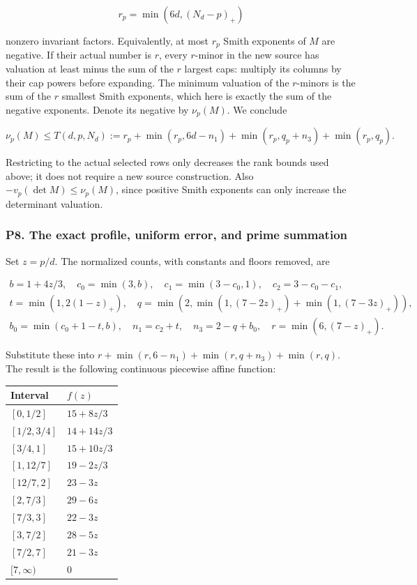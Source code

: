 \documentclass[11pt,a4paper]{article}
\begin{document}
\[
r_p=\min(6d,(N_d-p)_+)
\]

nonzero invariant factors. Equivalently, at most \(r_p\) Smith exponents of \(M\) are negative. If their actual number is \(r\), every \(r\)-minor in the new source has valuation at least minus the sum of the \(r\) largest caps: multiply its columns by their cap powers before expanding. The minimum valuation of the \(r\)-minors is the sum of the \(r\) smallest Smith exponents, which here is exactly the sum of the negative exponents. Denote its negative by \(ν_p(M)\). We conclude

\[
\nu_p(M)\le T(d,p,N_d)
:=r_p+\min(r_p,6d-n_1)+\min(r_p,q_p+n_3)+\min(r_p,q_p).\tag{35}
\]

Restricting to the actual selected rows only decreases the rank bounds used above; it does not require a new source construction. Also \(-v_p(\operatorname{det} M)≤ν_p(M)\), since positive Smith exponents can only increase the determinant valuation.

\hypertarget{p8.-the-exact-profile-uniform-error-and-prime-summation}{%
\subsubsection{P8. The exact profile, uniform error, and prime summation}\label{p8.-the-exact-profile-uniform-error-and-prime-summation}}

Set \(z=p/d\). The normalized counts, with constants and floors removed, are

\[
\begin{gathered}
b=1+4z/3,\quad c_0=\min(3,b),\quad c_1=\min(3-c_0,1),\quad c_2=3-c_0-c_1,\\
t=\min(1,2(1-z)_+),\quad
q=\min(2,\min(1,(7-2z)_+)+\min(1,(7-3z)_+)),\\
b_0=\min(c_0+1-t,b),\quad n_1=c_2+t,\quad n_3=2-q+b_0,\quad r=\min(6,(7-z)_+).
\end{gathered}
\]

Substitute these into \(r+\operatorname{min}(r,6-n_{1})+\operatorname{min}(r,q+n_{3})+\operatorname{min}(r,q)\). The result is the following continuous piecewise affine function:

\begin{longtable}[]{@{}ll@{}}
\toprule\noalign{}
Interval & \(f(z)\) \\
\midrule\noalign{}
\endhead
\bottomrule\noalign{}
\endlastfoot
\([0,1/2]\) & \(15+8z/3\) \\
\([1/2,3/4]\) & \(14+14z/3\) \\
\([3/4,1]\) & \(15+10z/3\) \\
\([1,12/7]\) & \(19-2z/3\) \\
\([12/7,2]\) & \(23-3z\) \\
\([2,7/3]\) & \(29-6z\) \\
\([7/3,3]\) & \(22-3z\) \\
\([3,7/2]\) & \(28-5z\) \\
\([7/2,7]\) & \(21-3z\) \\
\([7,∞)\) & \(0\) \\
\end{longtable}
\end{document}
